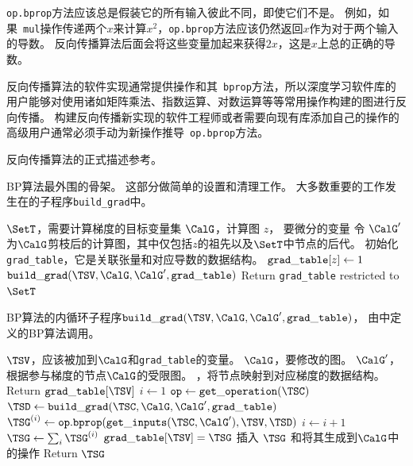 \verb|op.bprop|方法应该总是假装它的所有输入彼此不同，即使它们不是。
例如，如果~\verb|mul|操作传递两个$x$来计算$x^2$，\verb|op.bprop|方法应该仍然返回$x$作为对于两个输入的导数。
反向传播算法后面会将这些变量加起来获得$2x$，这是$x$上总的正确的导数。

反向传播算法的软件实现通常提供操作和其~\verb|bprop|方法，所以深度学习软件库的用户能够对使用诸如矩阵乘法、指数运算、对数运算等等常用操作构建的图进行反向传播。
构建反向传播新实现的软件工程师或者需要向现有库添加自己的操作的高级用户通常必须手动为新操作推导~\verb|op.bprop|方法。

反向传播算法的正式描述参考。

\begin{algorithm}[ht]
\caption{\gls{BP}算法最外围的骨架。
这部分做简单的设置和清理工作。
大多数重要的工作发生在的子程序{\tt build\_grad}中。
}
\label{alg:backprop}
\begin{algorithmic}
\REQUIRE $\SetT$，需要计算梯度的目标变量集
\REQUIRE $\CalG$，计算图
\REQUIRE $z$， 要微分的变量
\STATE 令 $\CalG'$ 为$\CalG$剪枝后的计算图，其中仅包括$z$的祖先以及$\SetT$中节点的后代。
\STATE 初始化 {\tt grad\_table}，它是关联张量和对应导数的数据结构。
\STATE ${\tt grad\_table}[z] \leftarrow 1$
\STATE ${\tt build\_grad}(\TSV, \CalG, \CalG', {\tt grad\_table})$
\ENDFOR
\STATE Return {\tt grad\_table} restricted to $\SetT$
\end{algorithmic}
\end{algorithm}

\begin{algorithm}[ht]
\caption{\gls{BP}算法的内循环子程序${\tt build\_grad}(\TSV, \CalG, \CalG', {\tt grad\_table})$，
由中定义的\gls{BP}算法调用。
}
\label{alg:build_grad}
\begin{algorithmic}
\REQUIRE $\TSV$，应该被加到$\CalG$和{\tt grad\_table}的变量。
\REQUIRE $\CalG$，要修改的图。
\REQUIRE $\CalG'$，根据参与梯度的节点$\CalG$的受限图。
，将节点映射到对应梯度的数据结构。
 \STATE Return ${\tt grad\_table}[\TSV]$
\ENDIF
\STATE $i \leftarrow 1$
\STATE ${\tt op} \leftarrow {\tt get\_operation}(\TSC)$
\STATE $\TSD \leftarrow {\tt build\_grad}(\TSC, \CalG, \CalG', {\tt grad\_table})$
\STATE $\TSG^{(i)} \leftarrow {\tt op.bprop}({\tt get\_inputs}(\TSC, \CalG'), \TSV, \TSD)$ 
\STATE $i \leftarrow i + 1$
\ENDFOR
\STATE $\TSG \leftarrow \sum_i \TSG^{(i)}$
\STATE ${\tt grad\_table}[\TSV] = \TSG$
\STATE 插入 $\TSG$ 和将其生成到$\CalG$中的操作
\STATE Return $\TSG$
\end{algorithmic}
\end{algorithm}


